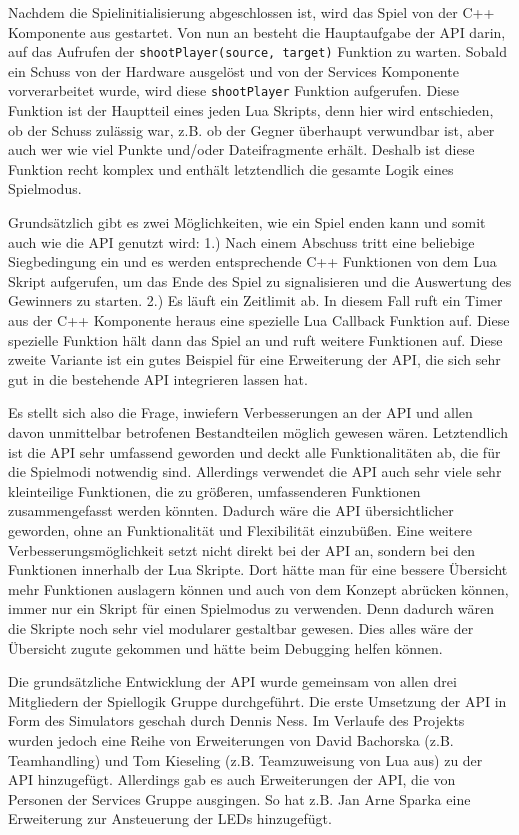 Nachdem die Spielinitialisierung abgeschlossen ist, wird das Spiel von der C++ Komponente
aus gestartet. Von nun an besteht die Hauptaufgabe der API darin, auf das Aufrufen der
\texttt{shootPlayer(source, target)} Funktion zu warten. Sobald ein Schuss von der Hardware
ausgelöst und von der Services Komponente vorverarbeitet wurde, wird diese \texttt{shootPlayer}
Funktion aufgerufen. Diese Funktion ist der Hauptteil eines jeden Lua Skripts, denn hier
wird entschieden, ob der Schuss zulässig war, z.B. ob der Gegner überhaupt verwundbar ist,
aber auch wer wie viel Punkte und/oder Dateifragmente erhält. Deshalb ist diese Funktion
recht komplex und enthält letztendlich die gesamte Logik eines Spielmodus.

Grundsätzlich gibt es zwei Möglichkeiten, wie ein Spiel enden kann und somit auch wie die
API genutzt wird: 1.) Nach einem Abschuss tritt eine beliebige Siegbedingung ein und es
werden entsprechende C++ Funktionen von dem Lua Skript aufgerufen, um das Ende des
Spiel zu signalisieren und die Auswertung des Gewinners zu starten. 2.) Es läuft ein Zeitlimit
ab. In diesem Fall ruft ein Timer aus der C++ Komponente heraus eine spezielle Lua Callback Funktion auf. Diese spezielle Funktion hält dann das Spiel an und ruft weitere Funktionen auf. Diese zweite Variante ist ein gutes Beispiel für eine Erweiterung der API, die sich sehr gut in die bestehende API integrieren lassen hat.

Es stellt sich also die Frage, inwiefern Verbesserungen an der API und allen davon unmittelbar betrofenen Bestandteilen möglich gewesen wären. Letztendlich ist die API sehr umfassend geworden und deckt alle Funktionalitäten ab, die für die Spielmodi notwendig sind. Allerdings verwendet die API auch sehr viele sehr kleinteilige Funktionen, die zu größeren, umfassenderen Funktionen zusammengefasst werden könnten. Dadurch wäre die API übersichtlicher geworden, ohne an Funktionalität und Flexibilität einzubüßen.
Eine weitere Verbesserungsmöglichkeit setzt nicht direkt bei der API an, sondern bei den
Funktionen innerhalb der Lua Skripte. Dort hätte man für eine bessere Übersicht mehr
Funktionen auslagern können und auch von dem Konzept abrücken können, immer nur ein
Skript für einen Spielmodus zu verwenden. Denn dadurch wären die Skripte noch sehr viel
modularer gestaltbar gewesen. Dies alles wäre der Übersicht zugute gekommen und hätte
beim Debugging helfen können.

Die grundsätzliche Entwicklung der API wurde gemeinsam von allen drei Mitgliedern der
Spiellogik Gruppe durchgeführt. Die erste Umsetzung der API in Form des Simulators
geschah durch Dennis Ness. Im Verlaufe des Projekts wurden jedoch eine Reihe von
Erweiterungen von David Bachorska (z.B. Teamhandling) und Tom Kieseling (z.B.
Teamzuweisung von Lua aus) zu der API hinzugefügt. Allerdings gab es auch Erweiterungen
der API, die von Personen der Services Gruppe ausgingen. So hat z.B. Jan Arne Sparka eine Erweiterung zur Ansteuerung der LEDs hinzugefügt.
